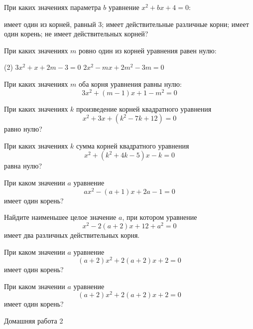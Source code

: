 \begin{class}[number=3]
	\begin{listofex}
		\item При каких значениях параметра \(b\) уравнение \(x^2+bx+4=0\):
		\begin{tasks}
			\task имеет один из корней, равный \( 3 \);
			\task имеет действительные различные корни;
			\task имеет один корень;
			\task не имеет действительных корней?
		\end{tasks}
		\item При каких значениях \(m\) ровно один из корней уравнения равен нулю:
		\begin{tasks}(2)
			\task \( 3x^2+x+2m-3=0 \)
			\task \( 2x^2-mx+2m^2-3m=0 \)
		\end{tasks}
		\item При каких значениях \(m\) оба корня уравнения равны нулю: \[ 3x^2+(m-1)x+1-m^2=0 \]
		\item При каких значениях \(k\) произведение корней квадратного уравнения \[x^2+3x+(k^2-7k+12)=0\] равно нулю?
		\item При каких значениях \(k\) сумма корней квадратного уравнения \[x^2+(k^2+4k-5)x-k=0\] равна нулю?
		\item При каком значении \(a\) уравнение \[ax^2-(a+1)x+2a-1=0\] имеет один корень?
		\item Найдите наименьшее целое значение \(a\), при котором уравнение \[x^2-2(a+2)x+12+a^2=0\] имеет два различных действительных корня.
		\item При каком значении \(a\) уравнение \[(a+2)x^2+2(a+2)x+2=0\] имеет один корень?
	\end{listofex}
\end{class}

\begin{class}[number=4]
	\begin{listofex}
		\item При каком значении \(a\) уравнение \[(a+2)x^2+2(a+2)x+2=0\] имеет один корень?
	\end{listofex}
\end{class}

\begin{homework}[number=2]
	\begin{listofex}
		\item Домашняя работа 2
	\end{listofex}
\end{homework}


